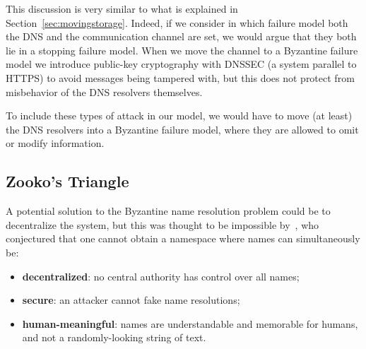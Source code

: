 \documentclass[mscthesis]{usiinfthesis}
\begin{document}
This discussion is very similar to what is explained in Section~\ref{sec:movingstorage}. Indeed, if we consider in which failure model both the DNS and the communication channel are set, we would argue that they both lie in a stopping failure model. When we move the channel to a Byzantine failure model we introduce public-key cryptography with DNSSEC (a system parallel to HTTPS) to avoid messages being tampered with, but this does not protect from misbehavior of the DNS resolvers themselves.

To include these types of attack in our model, we would have to move (at least) the DNS resolvers into a Byzantine failure model, where they are allowed to omit or modify information.



\subsection{Zooko's Triangle}

A potential solution to the Byzantine name resolution problem could be to decentralize the system, but this was thought to be impossible by~\cite{wilcox2003names}, who conjectured that one cannot obtain a namespace where names can simultaneously be:
\begin{itemize}
	\item \textbf{decentralized}: no central authority has control over all names;
	\item \textbf{secure}: an attacker cannot fake name resolutions;
	\item \textbf{human-meaningful}: names are understandable and memorable for humans, and not a randomly-looking string of text.
\end{itemize}
\end{document}
